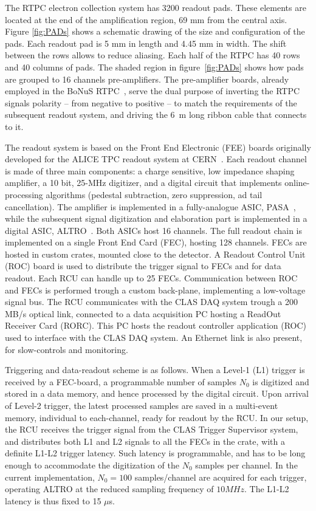 \documentclass[twocolumn,showpacs,superscriptaddress,groupedaddress]{revtex4}
\begin{document}
The RTPC electron collection system has 3200 readout pads. These elements are
located at the end of the amplification region, 69 mm from the central axis.
Figure \ref{fig:PADs} shows a schematic drawing of the size and 
configuration of the pads. Each readout pad is 5 mm in length and 4.45 mm in 
width.  The shift between the rows allows to reduce aliasing. Each half of the 
RTPC has 40 rows and 40 columns of pads. The shaded region in figure~\ref{fig:PADs} 
shows how pads are grouped to 16 channels pre-amplifiers. The pre-amplifier boards, 
already employed in the BoNuS RTPC~\cite{BONUS-NIM}, serve the dual purpose of 
inverting the RTPC signals polarity -- from negative to positive -- to match the 
requirements of the subsequent readout system, and driving the 6~m long ribbon 
cable that connects to it.

The readout system is based on the Front End Electronic (FEE) boards originally 
developed for the ALICE TPC readout system at CERN~\cite{ALICE-FEE}. Each 
readout channel is made of three main components: a charge sensitive, low 
impedance shaping amplifier, a 10 bit, 25-MHz digitizer, and a digital circuit 
that implements online-processing algorithms (pedestal subtraction, zero 
suppression, ad tail cancellation). The amplifier is implemented in a 
fully-analogue ASIC, PASA~\cite{ALICE-PASA}, while the subsequent signal 
digitization and elaboration part is implemented in a digital ASIC, 
ALTRO~\cite{ALICE-ALTRO}. Both ASICs host 16 channels. The full readout 
chain is implemented on a single Front End Card (FEC), hosting 128 channels. 
FECs are hosted in custom crates, mounted close to the detector. A Readout 
Control Unit (ROC) board is used to distribute the trigger signal to FECs 
and for data readout. Each RCU can handle up to 25 FECs. Communication 
between ROC and FECs is performed trough a custom back-plane, implementing 
a low-voltage signal bus. The RCU communicates with the CLAS DAQ system 
trough a 200 MB/s optical link, connected to a data acquisition PC hosting 
a ReadOut Receiver Card (RORC). This PC hosts the readout controller 
application (ROC) used to interface with the CLAS DAQ system. An Ethernet 
link is also present, for slow-controls and monitoring.

Triggering and data-readout scheme is as follows. When a Level-1 (L1) trigger 
is received by a FEC-board, a programmable number of samples $N_0$ is digitized 
and stored in a data memory, and hence processed by the digital circuit. Upon 
arrival of Level-2 trigger, the latest processed samples are saved in a 
multi-event memory, individual to each-channel, ready for readout by the RCU.  
In our setup, the RCU receives the trigger signal from the CLAS Trigger 
Supervisor system, and distributes both L1 and L2 signals to all the FECs in 
the crate, with a definite L1-L2 trigger latency. Such latency is programmable, 
and has to be long enough to accommodate the digitization of the $N_0$ samples 
per channel.  In the current implementation, $N_0=100$ samples/channel are 
acquired for each trigger, operating ALTRO at the reduced sampling frequency of 
$10 MHz$. The L1-L2 latency is thus fixed to 15 $\mu$s.
\end{document}
